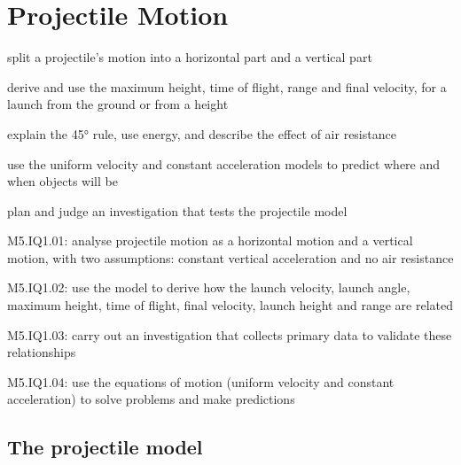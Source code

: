 \chapter{Projectile Motion}\label{ch1:chap}


\begin{goals}
  \item split a projectile's motion into a horizontal part and a vertical part
  \item derive and use the maximum height, time of flight, range and final velocity, for a
        launch from the ground or from a height
  \item explain the \ang{45} rule, use energy, and describe the effect of air resistance
  \item use the uniform velocity and constant acceleration models to predict where and when
        objects will be
  \item plan and judge an investigation that tests the projectile model
\end{goals}

\begin{syllabus}
  \item M5.IQ1.01: analyse projectile motion as a horizontal motion and a vertical motion, with
        two assumptions: constant vertical acceleration and no air resistance
  \item M5.IQ1.02: use the model to derive how the launch velocity, launch angle, maximum
        height, time of flight, final velocity, launch height and range are related
  \item M5.IQ1.03: carry out an investigation that collects primary data to validate these
        relationships
  \item M5.IQ1.04: use the equations of motion (uniform velocity and constant acceleration) to
        solve problems and make predictions
\end{syllabus}

\section{The projectile model}\label{ch1:sec:model}

